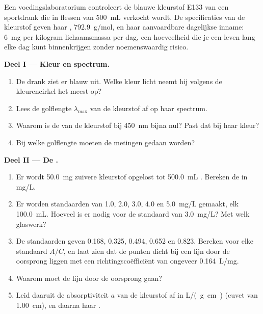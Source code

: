 \begin{problem}
\label{pb:g11:absorbance:1}
Een voedingslaboratorium controleert de blauwe kleurstof E133 van een
sportdrank die in flessen van \qty{500}{mL} verkocht wordt. De
specificaties van de kleurstof geven haar ,
\qty{792.9}{g/mol}, en haar aanvaardbare dagelijkse inname: \qty{6}{mg}
per kilogram lichaamsmassa per dag, een hoeveelheid die je een leven lang
elke dag kunt binnenkrijgen zonder noemenswaardig risico.

\medskip
\noindent\textbf{Deel I --- Kleur en spectrum.}
\begin{enumerate}
  \item De drank ziet er blauw uit. Welke kleur licht neemt hij volgens de
        kleurencirkel het meest op?
  \item Lees de golflengte $\lambda_{\max}$ van de kleurstof af op haar
        spectrum.
  \item Waarom is de  van de kleurstof bij \qty{450}{nm} bijna
        nul? Past dat bij haar kleur?
  \item Bij welke golflengte moeten de metingen gedaan worden?
\end{enumerate}

\medskip
\noindent\textbf{Deel II --- De .}
\begin{enumerate}[resume]
  \item Er wordt \qty{50.0}{mg} zuivere kleurstof opgelost tot
        \qty{500.0}{mL} . Bereken de  in
        \si{mg/L}.
  \item Er worden standaarden van 1.0, 2.0, 3.0, 4.0 en \qty{5.0}{mg/L}
        gemaakt, elk \qty{100.0}{mL}. Hoeveel  is er nodig
        voor de standaard van \qty{3.0}{mg/L}? Met welk glaswerk?
  \item De standaarden geven 0.168, 0.325, 0.494, 0.652 en 0.823. Bereken
        voor elke standaard $A / C$, en laat zien dat de punten dicht bij
        een lijn door de oorsprong liggen met een richtingscoëfficiënt van
        ongeveer \qty{0.164}{L/mg}.
  \item Waarom moet de lijn door de oorsprong gaan?
  \item Leid daaruit de absorptiviteit $a$ van de kleurstof af in
        \si{L/(g.cm)} (cuvet van \qty{1.00}{cm}), en daarna haar .
\end{enumerate}


\end{problem}
